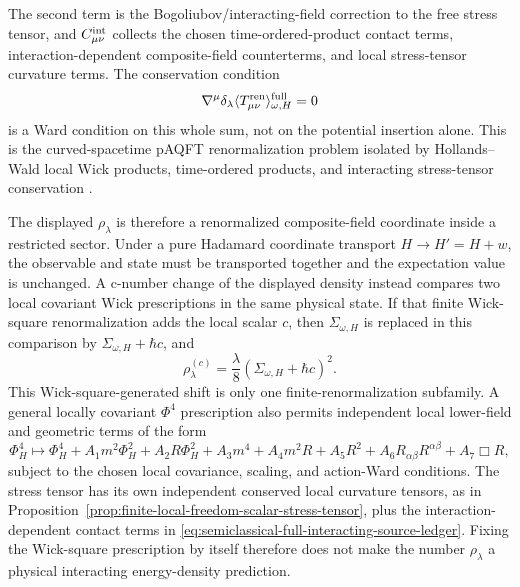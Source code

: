The second term is the Bogoliubov/interacting-field correction to the free
stress tensor, and \(C_{\mu\nu}^{\rm int}\) collects the chosen
time-ordered-product contact terms, interaction-dependent composite-field
counterterms, and local stress-tensor curvature terms.  The conservation
condition
\[
  \nabla^\mu
  \delta_\lambda
  \langle T_{\mu\nu}^{\rm ren}\rangle_{\omega,H}^{\rm full}
  =
  0
\]
is a Ward condition on this whole sum, not on the potential insertion alone.
This is the curved-spacetime pAQFT renormalization problem isolated by
Hollands--Wald local Wick products, time-ordered products, and interacting
stress-tensor conservation
\cite{HollandsWald2001LocalWick,HollandsWald2005Conservation,HollandsWald2015QFCS}.

The displayed \(\rho_\lambda\) is therefore a renormalized composite-field
coordinate inside a restricted sector.  Under a pure Hadamard coordinate
transport \(H\to H'=H+w\), the observable and state must be transported
together and the expectation value is unchanged.  A c-number change of the
displayed density instead compares two local covariant Wick prescriptions in
the same physical state.  If that finite Wick-square renormalization adds the
local scalar \(c\), then \(\Sigma_{\omega,H}\) is replaced in this comparison
by \(\Sigma_{\omega,H}+\hbar c\), and
\begin{equation}
  \rho_\lambda^{(c)}
  =
  \frac{\lambda}{8}
  \left(\Sigma_{\omega,H}+\hbar c\right)^2 .
  \label{eq:semiclassical-interacting-source-scheme-shift}
\end{equation}
This Wick-square-generated shift is only one finite-renormalization
subfamily.  A general locally covariant \(\Phi^4\) prescription also permits
independent local lower-field and geometric terms of the form
\[
  \Phi_H^4
  \mapsto
  \Phi_H^4
  +A_1m^2\Phi_H^2
  +A_2R\Phi_H^2
  +A_3m^4
  +A_4m^2R
  +A_5R^2
  +A_6R_{\alpha\beta}R^{\alpha\beta}
  +A_7\Box R ,
\]
subject to the chosen local covariance, scaling, and action-Ward conditions.
The stress tensor has its own independent conserved local curvature tensors,
as in Proposition~\ref{prop:finite-local-freedom-scalar-stress-tensor}, plus
the interaction-dependent contact terms in
\eqref{eq:semiclassical-full-interacting-source-ledger}.  Fixing the
Wick-square prescription by itself therefore does not make the number
\(\rho_\lambda\) a physical interacting energy-density prediction.

